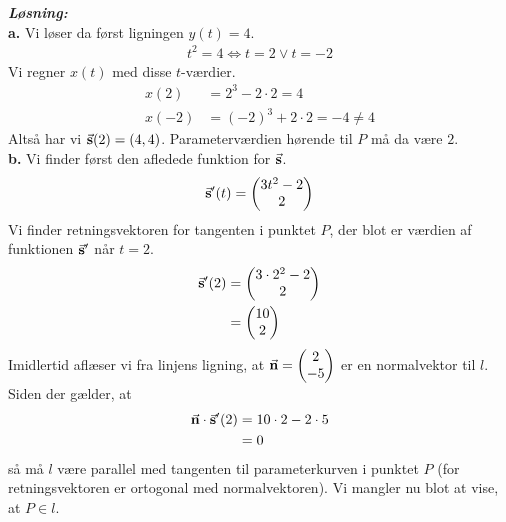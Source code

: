 \documentclass{article}
\newcommand{\sol}{\setlength{\parindent}{0cm}\textbf{\textit{Løsning:}}\setlength{\parindent}{1cm}}
\begin{document}
\sol \\
\textbf{a.}
Vi løser da først ligningen $y(t)=4$.
\begin{equation*}
\begin{split}
  t^2=4 \iff t=2 \lor t=-2
\end{split}
\end{equation*}
Vi regner $x(t)$ med disse $t$-værdier.
\begin{equation*}
\begin{split}
  x(2)&=2^3-2 \cdot 2=4\\ 
  x(-2)&=(-2)^3+2 \cdot 2=-4 \neq 4
\end{split}
\end{equation*}
Altså har vi $\va{s}(2)=(4,4)$. 
Parameterværdien hørende til $P$ må da være $2$. \\[1ex]
\textbf{b.}
Vi finder først den afledede funktion for $\va{s} $.
\begin{equation*}
\begin{split}
  \va{s}'(t)=\mqty(3t^2-2\\ 2) 
\end{split}
\end{equation*}
Vi finder retningsvektoren for tangenten i punktet $P$, der blot er værdien af funktionen $\va{s}'$ når $t=2$. 
\begin{equation*}
\begin{split}
  \va{s}'(2)&=\mqty(3 \cdot 2^2-2\\ 2) \\ 
  &=\mqty(10\\ 2) 
\end{split}
\end{equation*}
Imidlertid aflæser vi fra linjens ligning, at $\va{n} =\mqty(2\\ -5) $ er en normalvektor til $l$. 
Siden der gælder, at
\begin{equation*}
\begin{split}
  \va{n} \cdot \va{s}'(2)&=10 \cdot 2-2 \cdot 5\\ 
  &=0
\end{split}
\end{equation*}
så må $l$ være parallel med tangenten til parameterkurven i punktet $P$ (for retningsvektoren er ortogonal med normalvektoren). 
Vi mangler nu blot at vise, at $P \in l$.
\end{document}
